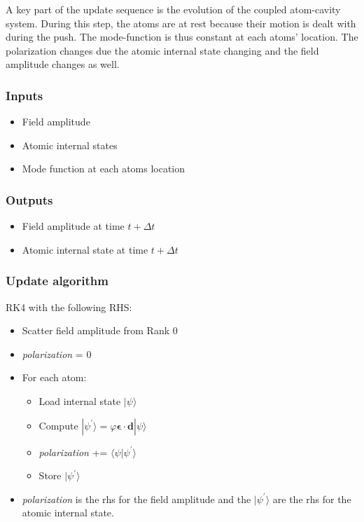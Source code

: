 \documentclass[aps, superscriptaddress, groupedaddress, preprint]{revtex4}
\renewcommand\vec{\mathbf}
\begin{document}
A key part of the update sequence is the evolution of the coupled
atom-cavity system.  During this step, the atoms are at rest
because their motion is dealt with during the push.  The
mode-function is thus constant at each atoms' location.  The
polarization changes due the atomic internal state changing and
the field amplitude changes as well.

\subsubsection{Inputs}

\begin{itemize}
\item Field amplitude
\item Atomic internal states
\item Mode function at each atoms location
\end{itemize}


\subsubsection{Outputs}

\begin{itemize}
\item Field amplitude at time $t+\Delta t$
\item Atomic internal state at time $t+\Delta t$
\end{itemize}


\subsubsection{Update algorithm}

RK4 with the following RHS\@:
\begin{itemize}
\item Scatter field amplitude from Rank 0
\item \textit{polarization} = 0
\item For each atom:
\begin{itemize}
  \item Load internal state $|\psi\rangle$
  \item Compute $|\psi^\prime\rangle =
                 \varphi\vec{\epsilon}\cdot\vec{d}|\psi\rangle$
  \item \textit{polarization} += $\langle\psi|\psi^\prime\rangle$
  \item Store $|\psi^\prime\rangle$
\end{itemize}
\item \textit{polarization} is the rhs for the field amplitude and
the $|\psi^\prime\rangle$ are the rhs for the atomic internal
state.
\end{itemize}
\end{document}
